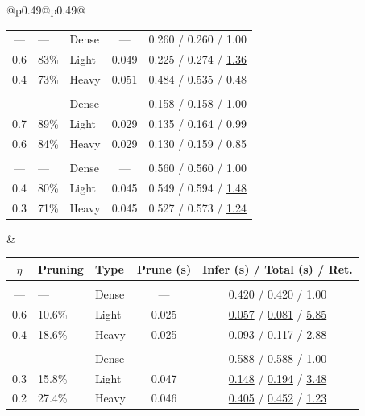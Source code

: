 \begin{table}[!htbp]
\begin{tabular}{@{}p{}@{}p{}@{}}
\begin{tabular}{c l l c c}
--- & --- & Dense & --- & 0.260 / 0.260 / 1.00 \\
0.6 & 83\% & Light & 0.049 & 0.225 / 0.274 / \underline{1.36} \\
0.4 & 73\% & Heavy & 0.051 & 0.484 / 0.535 / 0.48 \\
\addlinespace[0.5pt]
\rowcolor{lightgray} \multicolumn{5}{c}{\rule{0pt}{2.2ex}\textbf{LLaMA-3.1-8B (Selected-domain)}\rule[-0.8ex]{0pt}{0pt}} \\
--- & --- & Dense & --- & 0.158 / 0.158 / 1.00 \\
0.7 & 89\% & Light & 0.029 & 0.135 / 0.164 / 0.99 \\
0.6 & 84\% & Heavy & 0.029 & 0.130 / 0.159 / 0.85 \\
\addlinespace[0.5pt]
\rowcolor{lightgray} \multicolumn{5}{c}{\rule{0pt}{2.2ex}\textbf{LLaMA-2-13B (Selected-domain)}\rule[-0.8ex]{0pt}{0pt}} \\
--- & --- & Dense & --- & 0.560 / 0.560 / 1.00 \\
0.4 & 80\% & Light & 0.045 & 0.549 / 0.594 / \underline{1.48} \\
0.3 & 71\% & Heavy & 0.045 & 0.527 / 0.573 / \underline{1.24} \\
\bottomrule
\end{tabular} &\begin{tabular}{c l l c c}
\toprule
\textbf{$\eta$} & \textbf{Pruning} & \textbf{Type} & \textbf{Prune (s)} & \textbf{Infer (s)} / \textbf{Total (s)} / \textbf{Ret.} \\
\midrule
\rowcolor{lightgray} \multicolumn{5}{c}{\rule{0pt}{2.2ex}\textbf{Qwen2.5-7B (CommonsenseQA)}\rule[-0.8ex]{0pt}{0pt}} \\
--- & --- & Dense & --- & 0.420 / 0.420 / 1.00 \\
0.6 & 10.6\% & Light & 0.025 & \underline{0.057} / \underline{0.081} / \underline{5.85} \\
0.4 & 18.6\% & Heavy & 0.025 & \underline{0.093} / \underline{0.117} / \underline{2.88} \\
\addlinespace[0.5pt]
\rowcolor{lightgray} \multicolumn{5}{c}{\rule{0pt}{2.2ex}\textbf{Qwen2.5-14B (CommonsenseQA)}\rule[-0.8ex]{0pt}{0pt}} \\
--- & --- & Dense & --- & 0.588 / 0.588 / 1.00 \\
0.3 & 15.8\% & Light & 0.047 & \underline{0.148} / \underline{0.194} / \underline{3.48} \\
0.2 & 27.4\% & Heavy & 0.046 & \underline{0.405} / \underline{0.452} / \underline{1.23} \\

\end{tabular}
\end{tabular}
\end{table}
